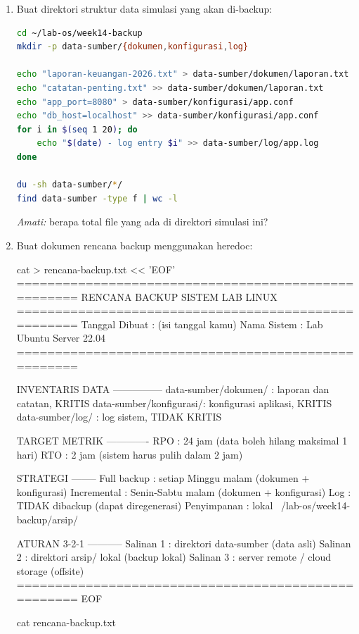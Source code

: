 \begin{enumerate}
    \item Buat direktori struktur data simulasi yang akan di-backup:
\begin{lstlisting}[language=bash, caption={Menyiapkan direktori dan data simulasi}]
cd ~/lab-os/week14-backup
mkdir -p data-sumber/{dokumen,konfigurasi,log}

echo "laporan-keuangan-2026.txt" > data-sumber/dokumen/laporan.txt
echo "catatan-penting.txt" >> data-sumber/dokumen/laporan.txt
echo "app_port=8080" > data-sumber/konfigurasi/app.conf
echo "db_host=localhost" >> data-sumber/konfigurasi/app.conf
for i in $(seq 1 20); do
    echo "$(date) - log entry $i" >> data-sumber/log/app.log
done

du -sh data-sumber/*/
find data-sumber -type f | wc -l
\end{lstlisting}
    \textit{Amati:} berapa total file yang ada di direktori simulasi ini?

    \item Buat dokumen rencana backup menggunakan heredoc:
\begin{longlisting}[language=bash, caption={Membuat rencana backup dengan heredoc}]
cat > rencana-backup.txt << 'EOF'
====================================================
RENCANA BACKUP SISTEM LAB LINUX
====================================================
Tanggal Dibuat : (isi tanggal kamu)
Nama Sistem    : Lab Ubuntu Server 22.04
====================================================

INVENTARIS DATA
---------------
data-sumber/dokumen/    : laporan dan catatan, KRITIS
data-sumber/konfigurasi/: konfigurasi aplikasi, KRITIS
data-sumber/log/        : log sistem, TIDAK KRITIS

TARGET METRIK
-------------
RPO : 24 jam (data boleh hilang maksimal 1 hari)
RTO : 2 jam  (sistem harus pulih dalam 2 jam)

STRATEGI
--------
Full backup    : setiap Minggu malam (dokumen + konfigurasi)
Incremental    : Senin-Sabtu malam (dokumen + konfigurasi)
Log            : TIDAK dibackup (dapat diregenerasi)
Penyimpanan    : lokal ~/lab-os/week14-backup/arsip/

ATURAN 3-2-1
-----------
Salinan 1 : direktori data-sumber (data asli)
Salinan 2 : direktori arsip/ lokal (backup lokal)
Salinan 3 : server remote / cloud storage (offsite)
====================================================
EOF

cat rencana-backup.txt
\end{longlisting}


\end{enumerate}
